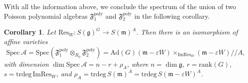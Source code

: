 \documentclass[11pt]{amsart}
\theoremstyle{definition}
\theoremstyle{plain}
\newtheorem{corollary}[theorem]{Corollary}
\theoremstyle{conclusion}
\begin{document}
With all the information above, we conclude the spectrum of the union of two Poisson polynomial algebras $\mathfrak{F}_1^{\mathrm{poly}}$ and $\mathfrak{F}_2^{\mathrm{poly}}$ in the following corollary. 
\begin{corollary}
\label{cor:union}
Let $\mathrm{Res}_W: S(\mathfrak{g})^G \rightarrow S(\mathfrak{m})^A $. Then there is an isomorphism of affine varieties $$ \mathrm{Spec}\,\mathcal{A}=\mathrm{Spec}(\mathfrak{F}_1^{\mathrm{poly}}\otimes_{R_0}\mathfrak{F}_2^{\mathrm{poly}})=\mathrm{Ad}(G)(\mathfrak{m}-\varepsilon W)\times_{\mathrm{Im}\mathrm{Res}_W} \left(\mathfrak{m} - \varepsilon W\right)//A , $$ with dimension $\dim \mathrm{Spec} \,\mathcal{A}=n-r+\rho_A$, where $n=\dim\mathfrak{g}$, $r=\mathrm{rank}(G)$, $s=\mathrm{trdeg} \, \mathrm{Im}\mathrm{Res}_W$, and $\rho_A=\mathrm{trdeg} \, S(\mathfrak{m})^A  = \mathrm{trdeg} \, S(\mathfrak{m} -\varepsilon W)^A$.
\end{corollary}
 
 
\end{document}
